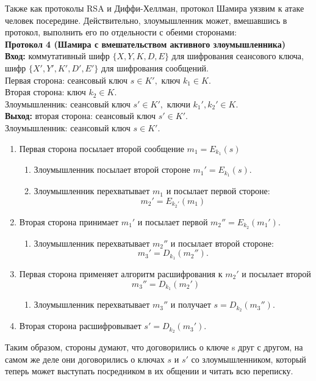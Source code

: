 
Также как протоколы RSA и Диффи-Хеллман, протокол Шамира уязвим к атаке человек посередине. Действительно, злоумышленник может, вмешавшись в протокол, выполнить его по отдельности с обеими сторонами:\\
\textbf{Протокол 4 (Шамира с вмешательством активного злоумышленника)}\\
\hspace*{10mm}\textbf{Вход:} коммутативный шифр $\{X, Y, K, D, E\}$ для шифрования сеансового ключа, шифр $\{X', Y', K', D', E'\}$ для шифрования сообщений.\\
Первая сторона: сеансовый ключ $s\in K',$ ключ $k_{1}\in K.$\\
Вторая сторона: ключ $k_{2}\in K$.\\
Злоумышленник: сеансовый ключ $s'\in K',$  ключи $k_{1}',k_{2}'\in K.$\\
\hspace*{10mm}\textbf{Выход:} вторая сторона: сеансовый ключ $s'\in K'$.\\
Злоумышленник: сеансовый ключ $s\in K'.$
\begin{enumerate}
	\item Первая сторона посылает второй сообщение $m_{1} = E_{k_{1}}(s)$
	\begin{enumerate}
		\item Злоумышленник посылает второй стороне $m_{1}' = E_{k_{1}}(s).$
		\item Злоумышленник перехватывает $m_{1}$ и посылает первой стороне:
		$$m_{2}' = E_{k_{2}'}(m_{1})$$
	\end{enumerate}
	\item Вторая сторона принимает $m_1'$ и посылает первой $m_{2}''= E_{k_{2}} (m_{1}').$
	\begin{enumerate}
		\item Злоумышленник перехватывает $m_{2}''$ и посылает второй стороне:
		$$m_{3}'  = D_{k_{1}}(m_{2}'').$$
	\end{enumerate}
	\item Первая сторона применяет алгоритм расшифрования к $m_{2}'$ и посылает второй
	$$m_{3}'' = D_{k_{1}}(m_{2}')$$
	\begin{enumerate}
		\item Злоумышленник перехватывает $m_{3}''$ и получает $s = D_{k_{2}} (m_{3}'')$.
	\end{enumerate}
	\item Вторая сторона расшифровывает $s' = D_{k_{2}}(m_{3}')$.
\end{enumerate}
Таким образом, стороны думают, что договорились о ключе s друг с другом, на самом же деле они договорились о ключах $s$ и $s'$ со злоумышленником, который теперь может выступать посредником в их общении и читать всю переписку.
